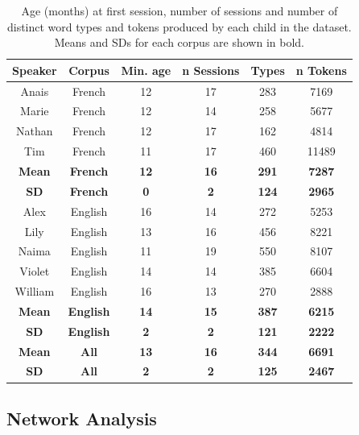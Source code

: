 \documentclass[
  man]{apa6}
\begin{document}
\begin{longtable}[t]{cccccc}
\caption{\label{tab:table-data-overview}Age (months) at first session, number of sessions and number of distinct word types and tokens produced by each child in the dataset. Means and SDs for each corpus are shown in bold.}\\
\toprule
Speaker & Corpus & Min. age & n Sessions & Types & n Tokens\\
\midrule
Anais & French & 12 & 17 & 283 & 7169\\
Marie & French & 12 & 14 & 258 & 5677\\
Nathan & French & 12 & 17 & 162 & 4814\\
Tim & French & 11 & 17 & 460 & 11489\\
\midrule
\textbf{Mean} & \textbf{French} & \textbf{12} & \textbf{16} & \textbf{291} & \textbf{7287}\\
\addlinespace
\textbf{SD} & \textbf{French} & \textbf{0} & \textbf{2} & \textbf{124} & \textbf{2965}\\
\midrule
Alex & English & 16 & 14 & 272 & 5253\\
Lily & English & 13 & 16 & 456 & 8221\\
Naima & English & 11 & 19 & 550 & 8107\\
Violet & English & 14 & 14 & 385 & 6604\\
\addlinespace
William & English & 16 & 13 & 270 & 2888\\
\midrule
\textbf{Mean} & \textbf{English} & \textbf{14} & \textbf{15} & \textbf{387} & \textbf{6215}\\
\textbf{SD} & \textbf{English} & \textbf{2} & \textbf{2} & \textbf{121} & \textbf{2222}\\
\midrule
\textbf{Mean} & \textbf{All} & \textbf{13} & \textbf{16} & \textbf{344} & \textbf{6691}\\
\textbf{SD} & \textbf{All} & \textbf{2} & \textbf{2} & \textbf{125} & \textbf{2467}\\
\bottomrule
\end{longtable}

\hypertarget{network-analysis}{%
\subsection{Network Analysis}\label{network-analysis}}
\end{document}
